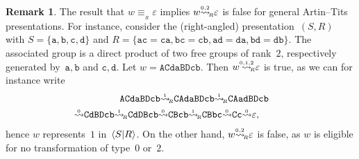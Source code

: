 \documentclass{amsart}
\numberwithin{equation}{section}
\theoremstyle{plain}
\theoremstyle{definition}
\newtheorem{rema}[prop]{Remark}
\begin{document}
\begin{rema}
\label{R:CounterArtin}
The result that ${w} {\equiv_{{\!{}_{R}}}} {\varepsilon}$ implies ${w} {\overset{{}_{{0,2}}}{\rightsquigarrow}_{\hspace{-0.4ex}{\scriptscriptstyle R}}} {\varepsilon}$ is false for general Artin--Tits presentations. For instance, consider the (right-angled) presentation~$({S}, {R})$ with ${S} = \{{\mathtt{a}}, {\mathtt{b}}, {\mathtt{c}}, {\mathtt{d}}\}$ and ${R} = \{
{\mathtt{a}} {\mathtt{c}} = {\mathtt{c}} {\mathtt{a}}, {\mathtt{b}} {\mathtt{c}} = {\mathtt{c}} {\mathtt{b}}, {\mathtt{a}} {\mathtt{d}} = {\mathtt{d}} {\mathtt{a}}, {\mathtt{b}} {\mathtt{d}} = {\mathtt{d}} {\mathtt{b}}\}$.
The associated group is a direct product of two free groups of rank~$2$, respectively generated by~${\mathtt{a}}, {\mathtt{b}}$ and ${\mathtt{c}}, {\mathtt{d}}$. Let ${w} = {\mathtt{A}} {\mathtt{C}} {\mathtt{d}} {\mathtt{a}} {\mathtt{B}} {\mathtt{D}} {\mathtt{c}} {\mathtt{b}}$. Then ${w} {\mathrel{{\mathrel{\overset{\scriptscriptstyle 0,1,2}{\rightsquigarrow}}}_{\hspace{-0.9ex}{\scriptscriptstyle R}}}} {\varepsilon}$ is true, as we can for instance write
\begin{multline*}
\hspace{10mm}{\mathtt{A}} {\mathtt{C}} {\mathtt{d}} {\mathtt{a}} {\mathtt{B}} {\mathtt{D}} {\mathtt{c}} {\mathtt{b}}
{\overset{{}_{1}}{\rightsquigarrow}_{\hspace{-0.4ex}{\scriptscriptstyle R}}} {\mathtt{C}} {\mathtt{A}} {\mathtt{d}} {\mathtt{a}} {\mathtt{B}} {\mathtt{D}} {\mathtt{c}} {\mathtt{b}}
{\overset{{}_{1}}{\rightsquigarrow}_{\hspace{-0.4ex}{\scriptscriptstyle R}}} {\mathtt{C}} {\mathtt{A}} {\mathtt{a}} {\mathtt{d}} {\mathtt{B}} {\mathtt{D}} {\mathtt{c}} {\mathtt{b}}\\
{\overset{{}_{0}}{\rightsquigarrow}} {\mathtt{C}} {\mathtt{d}} {\mathtt{B}} {\mathtt{D}} {\mathtt{c}} {\mathtt{b}}
{\overset{{}_{1}}{\rightsquigarrow}_{\hspace{-0.4ex}{\scriptscriptstyle R}}} {\mathtt{C}} {\mathtt{d}} {\mathtt{D}} {\mathtt{B}} {\mathtt{c}} {\mathtt{b}}
{\overset{{}_{0}}{\rightsquigarrow}} {\mathtt{C}} {\mathtt{B}} {\mathtt{c}} {\mathtt{b}}
{\overset{{}_{1}}{\rightsquigarrow}_{\hspace{-0.4ex}{\scriptscriptstyle R}}} {\mathtt{C}} {\mathtt{B}} {\mathtt{b}} {\mathtt{c}} 
{\overset{{}_{0}}{\rightsquigarrow}} {\mathtt{C}} {\mathtt{c}}
{\overset{{}_{0}}{\rightsquigarrow}} {\varepsilon},\hspace{10mm}
\end{multline*}
hence ${w}$ represents~$1$ in~${\langle{S}{\mid}\nobreak{R}\rangle}$. On the other hand, ${w} {\overset{{}_{{0,2}}}{\rightsquigarrow}_{\hspace{-0.4ex}{\scriptscriptstyle R}}} {\varepsilon}$ is false, as ${w}$ is eligible for no transformation of type~$0$ or~$2$. 
\end{rema}
\end{document}
